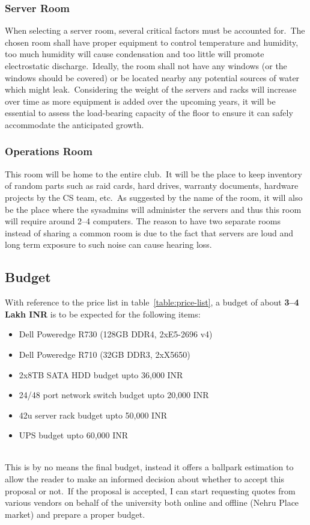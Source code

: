 \subsubsection{Server Room}
When selecting a server room, several critical factors must be accounted for.\ The chosen room shall have proper
equipment to control temperature and humidity, too much humidity will cause condensation and too little will promote
electrostatic discharge.\ Ideally, the room shall not have any windows (or the windows should be covered) or be located
nearby any potential sources of water which might leak.\ Considering the weight of the servers and racks will increase
over time as more equipment is added over the upcoming years, it will be essential to assess the load-bearing capacity
of the floor to ensure it can safely accommodate the anticipated growth.

\subsubsection{Operations Room}
This room will be home to the entire club.\ It will be the place to keep inventory of random parts such as raid cards,
hard drives, warranty documents, hardware projects by the CS team, etc.\ As suggested by the name of the room, it will
also be the place where the sysadmins will administer the servers and thus this room will require around 2--4 computers.
The reason to have two separate rooms instead of sharing a common room is due to the fact that servers are loud and long
term exposure to such noise can cause hearing loss.


\subsection{Budget}\label{subsec:budget}
With reference to the price list in table~\ref{table:price-list}, a budget of about \textbf{\large3--4 Lakh INR} is
to be expected for the following items:
\begin{itemize}
    \item Dell Poweredge R730 (128GB DDR4, 2xE5-2696 v4)
    \item Dell Poweredge R710 (32GB DDR3, 2xX5650)
    \item 2x8TB SATA HDD budget upto 36,000 INR
    \item 24/48 port network switch budget upto 20,000 INR
    \item 42u server rack budget upto 50,000 INR
    \item UPS budget upto 60,000 INR
\end{itemize}
\\
This is by no means the final budget, instead it offers a ballpark estimation to allow the reader to make an informed
decision about whether to accept this proposal or not.\ If the proposal is accepted, I can start requesting quotes
from various vendors on behalf of the university both online and offline (Nehru Place market) and prepare a proper
budget.


